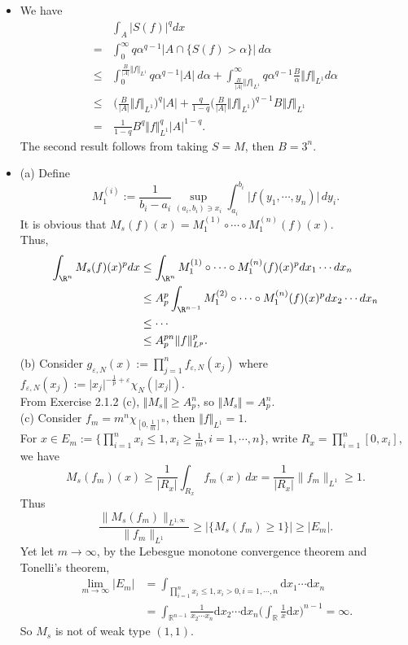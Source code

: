 \begin{itemize}
\item[2.1.5]
We have
\begin{align*}
&\int_A\vert S(f)\vert^qdx\\
=&\int_0^\infty q\alpha^{q-1}\vert A\cap\{S(f)>\alpha\}\vert\>d\alpha\\
\leq &\int_0^{\frac{B}{\vert A\vert}\Vert f\Vert_{L^1}}q\alpha^{q-1}\vert A\vert\>d\alpha+\int_{\frac{B}{\vert A\vert}\Vert f\Vert_{L^1}}^\infty q\alpha^{q-1}\frac{B}{\alpha}\Vert f\Vert_{L^1}d\alpha\\
\leq &\,\Big(\frac{B}{\vert A\vert}\Vert f\Vert_{L^1}\Big)^q|A|+\frac{q}{1-q}\Big(\frac{B}{\vert A\vert}\Vert f\Vert_{L^1}\Big)^{q-1}B\Vert f\Vert_{L^1}\\
= &\,\frac1{1-q}B^q\Vert f\Vert_{L^1}^q\vert A\vert^{1-q}.
\end{align*}
The second result follows from taking $S=M$, then $B=3^n$.

\item[2.1.6]

(a) Define 
$$M_1^{(i)}:=\frac{1}{b_i-a_i}\sup_{(a_i,b_i)\ni x_i}\int_{a_i}^{b_i}\vert f(y_1,\cdots,y_n)\vert \,dy_i.$$ 
It is obvious that $M_s(f)(x)= M_1^{(1)}\circ\cdots\circ M_1^{(n)}(f)(x)$.\\
Thus, 
\begin{align*}
\int_{\R^n}  M_s(f)(x)^pdx
&\leq \int_{\R^n} M_1^{(1)}\circ\cdots\circ M_1^{(n)}(f)(x)^pdx_1\cdots dx_n\\
&\leq A_p^p\int_{\R^{n-1}} M_1^{(2)}\circ\cdots\circ M_1^{(n)}(f)(x)^pdx_2\cdots dx_n\\
&\leq \cdots\\
&\leq A_p^{pn}\Vert f\Vert_{L^p}^p.
\end{align*}
(b) Consider $g_{\varepsilon,N}(x):=\prod\limits_{j=1}^nf_{\varepsilon,N}(x_j)$ 
where $f_{\varepsilon,N}(x_j):=\vert x_j \vert^{-\frac1p+\varepsilon}\chi_N(\vert x_j \vert)$.\\
From Exercise 2.1.2 (c), $\Vert M_s\Vert\geq A_p^n$, so $\Vert M_s\Vert=A_p^n$.\\
(c) Consider $f_m=m^n\chi_{[0,\frac1m]^n}$, then $\Vert f\Vert _{L^1}=1$.\\
For $x\in E_m:=\Big\{\prod\limits_{i=1}^n x_i\leq 1, x_i\geq \frac1m, i=1,\cdots,n\Big\}$, 
write $R_x=\prod\limits_{i=1}^n[0,x_i]$, we have
$$M_s(f_m)(x)\geq \frac{1}{\vert R_x\vert }\int _{R_x}f_m(x)\,dx= \frac1{|R_x|}\|f_m\|_{L^1}\geq 1.$$
Thus $$\frac{\|M_s(f_m)\|_{L^{1,\infty}}}{\|f_m\|_{L^1}}\geq |\{M_s(f_m)\geq1\}|\geq |E_m|.$$
Yet let $m\rightarrow\infty$, by the Lebesgue monotone convergence theorem and Tonelli's theorem, 
\begin{align*}
    \lim_{m\rightarrow \infty}|E_m|
    &=\int_{\prod\limits_{i=1}^nx_i\leq 1, x_i>0, i=1,\cdots ,n}\mathrm{d}x_1\cdots \mathrm{d}x_n\\
    &=\int_{\mathbb{R}^{n-1}}\frac1{x_2\cdots x_n}\mathrm{d}x_2\cdots \mathrm{d}x_n
    \bigg(\int_{\mathbb{R}}\frac1x\mathrm{d}x\bigg)^{n-1}=\infty.
\end{align*}
So $M_s$ is not of weak type $(1,\!1)$.


\end{itemize}
